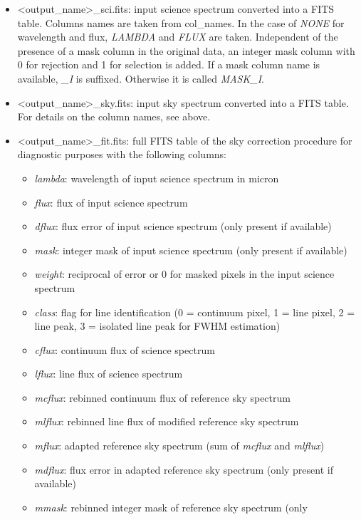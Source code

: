 \begin{itemize}
\item <{\sc output\_name}>\_sci.fits: input science spectrum converted into
a \ac{FITS} table. Columns names are taken from {\sc col\_names}. In the case
of {\it NONE} for wavelength and flux, {\it LAMBDA} and {\it FLUX} are taken.
Independent of the presence of a mask column in the original data, an integer
mask column with 0 for rejection and 1 for selection is added. If a mask column
name is available, {\it \_I} is suffixed. Otherwise it is called {\it MASK\_I}.
\item <{\sc output\_name}>\_sky.fits: input sky spectrum converted into a
\ac{FITS} table. For details on the column names, see above.
\item <{\sc output\_name}>\_fit.fits: full \ac{FITS} table of the sky
correction procedure for diagnostic purposes with the following columns:
  \begin{itemize}
  \item {\it lambda}: wavelength of input science spectrum in micron
  \item {\it flux}: flux of input science spectrum
  \item {\it dflux}: flux error of input science spectrum (only present if
        available)
  \item {\it mask}: integer mask of input science spectrum (only present if
        available)
  \item {\it weight}: reciprocal of error or 0 for masked pixels in the input
        science spectrum
  \item {\it class}: flag for line identification (0 = continuum pixel,
        1 = line pixel, 2 = line peak, 3 = isolated line peak for FWHM
        estimation)
  \item {\it cflux}: continuum flux of science spectrum
  \item {\it lflux}: line flux of science spectrum
  \item {\it mcflux}: rebinned continuum flux of reference sky spectrum
  \item {\it mlflux}: rebinned line flux of modified reference sky spectrum
  \item {\it mflux}: adapted reference sky spectrum (sum of {\it mcflux} and
        {\it mlflux})
  \item {\it mdflux}: flux error in adapted reference sky spectrum (only
        present if available)
  \item {\it mmask}: rebinned integer mask of reference sky spectrum (only

\end{itemize}
\end{itemize}
